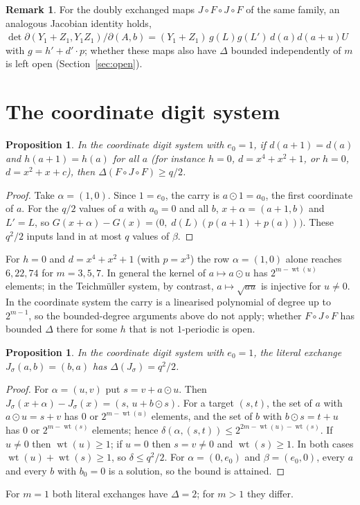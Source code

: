 \documentclass[11pt]{amsart}
\newtheorem{proposition}[theorem]{Proposition}
\theoremstyle{definition}
\newtheorem{remark}[theorem]{Remark}
\newcommand{\diff}{\delta}
\DeclareMathOperator{\wt}{wt}
\begin{document}
\begin{remark}
For the doubly exchanged maps $J\circ F\circ J\circ F$ of the same family, an analogous Jacobian identity holds,
$\det\partial(Y_1+Z_1,Y_1Z_1)/\partial(A,b)=(Y_1+Z_1)\,g(L)g(L')\,d(a)d(a+u)U$ with $g=h'+d'\cdot p$; whether these maps also have $\Delta$
bounded independently of $m$ is left open (Section~\ref{sec:open}).
\end{remark}

\section{The coordinate digit system}\label{sec:coord}

\begin{proposition}\label{prop:sigma}
In the coordinate digit system with $e_0=1$, if $d(a+1)=d(a)$ and $h(a+1)=h(a)$ for all $a$ (for instance $h=0$, $d=x^4+x^2+1$, or $h=0$,
$d=x^2+x+c$), then $\Delta(F\circ J\circ F)\ge q/2$.
\end{proposition}
\begin{proof}
Take $\alpha=(1,0)$. Since $1=e_0$, the carry is $a\odot1=a_0$, the first coordinate of $a$. For the
$q/2$ values of $a$ with $a_0=0$ and all $b$, $x+\alpha=(a+1,b)$ and $L'=L$, so $G(x+\alpha)-G(x)=\bigl(0,\;d(L)(p(a+1)+p(a))\bigr)$.
These $q^2/2$ inputs land in at most $q$ values of $\beta$.
\end{proof}

For $h=0$ and $d=x^4+x^2+1$ (with $p=x^3$) the row $\alpha=(1,0)$ alone reaches $6,22,74$ for $m=3,5,7$. In general the
kernel of $a\mapsto a\odot u$ has $2^{m-\wt(u)}$ elements; in the Teichm\"uller system, by contrast,
$a\mapsto\sqrt{au}$ is injective for $u\ne0$. In the coordinate system the carry is a linearised polynomial of degree up to $2^{m-1}$, so the bounded-degree
arguments above do not apply; whether $F\circ J\circ F$ has bounded $\Delta$ there for some $h$ that is not $1$-periodic is open.

\begin{proposition}\label{prop:Jsigma}
In the coordinate digit system with $e_0=1$, the literal exchange $J_\sigma(a,b)=(b,a)$ has $\Delta(J_\sigma)=q^2/2$.
\end{proposition}
\begin{proof}
For $\alpha=(u,v)$ put $s=v+a\odot u$. Then $J_\sigma(x+\alpha)-J_\sigma(x)=(s,\,u+b\odot s)$. For a target $(s,t)$, the set of $a$
with $a\odot u=s+v$ has $0$ or $2^{m-\wt(u)}$ elements, and the set of $b$ with $b\odot s=t+u$ has $0$ or $2^{m-\wt(s)}$ elements;
hence $\diff(\alpha,(s,t))\le2^{2m-\wt(u)-\wt(s)}$. If $u\ne0$ then $\wt(u)\ge1$; if $u=0$ then $s=v\ne0$ and $\wt(s)\ge1$. In both
cases $\wt(u)+\wt(s)\ge1$, so $\diff\le q^2/2$. For
$\alpha=(0,e_0)$ and $\beta=(e_0,0)$, every $a$ and every $b$ with $b_0=0$ is a solution, so the bound is attained.
\end{proof}
For $m=1$ both literal exchanges have $\Delta=2$; for $m>1$ they differ.
\end{document}
